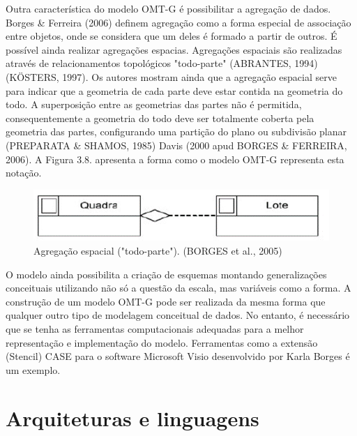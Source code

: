 		Outra característica do modelo OMT-G é possibilitar a agregação de dados. Borges \& Ferreira (2006) definem agregação como a forma especial de associação entre objetos, onde se considera que um deles é formado a partir de outros. É possível ainda realizar agregações espacias. Agregações espaciais são realizadas através de relacionamentos topológicos "todo-parte" (ABRANTES, 1994) (KÖSTERS, 1997). Os autores mostram ainda que a agregação espacial  serve para indicar que a geometria de cada parte deve estar contida na geometria do todo. A superposição entre as geometrias das partes não é permitida, consequentemente a geometria do todo deve ser totalmente coberta pela geometria das partes, configurando uma partição do plano ou subdivisão planar (PREPARATA \& SHAMOS, 1985) Davis (2000 apud BORGES \& FERREIRA, 2006). A Figura 3.8. apresenta a forma como o modelo OMT-G representa esta notação. 
		
		\begin{figure} [h]
			\centering
			\includegraphics[width=1\linewidth]{data/agregacao_espacial}
			\caption{Agregação espacial ("todo-parte"). (BORGES et al., 2005)}
			\label{fig:agregacaoespacial}
		\end{figure}
		
		O modelo ainda possibilita a criação de esquemas montando generalizações conceituais utilizando não só a questão da escala, mas variáveis como a forma. A construção de um modelo OMT-G pode ser realizada da mesma forma que qualquer outro tipo de modelagem conceitual de dados. No entanto, é necessário que se tenha as ferramentas computacionais adequadas para a melhor representação e implementação do modelo. Ferramentas como a extensão (Stencil) CASE para o software Microsoft Visio desenvolvido por Karla Borges é um exemplo.  
		
		\section{Arquiteturas e linguagens}
		
